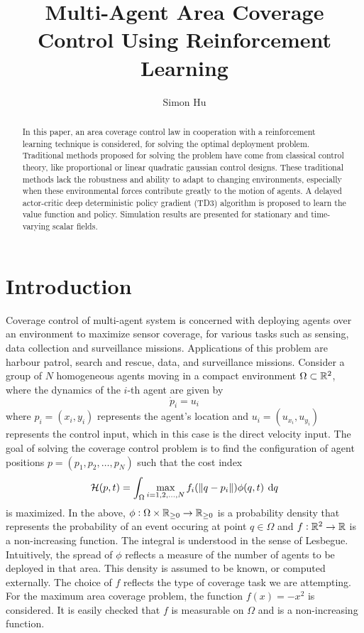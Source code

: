 \documentclass[10pt,conference]{IEEEtran}
\title{\bf\Large{Multi-Agent Area Coverage Control Using Reinforcement Learning}}
\author{Simon Hu}
\begin{document}
	
\maketitle
\thispagestyle{empty}
\pagestyle{empty}
\begin{abstract}
	In this paper, an area coverage control law in cooperation with a reinforcement learning technique is considered, for solving the optimal deployment problem. Traditional methods proposed for solving the problem have come from classical control theory, like proportional or linear quadratic gaussian control designs. These traditional methods lack the robustness and ability to adapt to changing environments, especially when these environmental forces contribute greatly to the motion of agents. A delayed actor-critic deep deterministic policy gradient (TD3) algorithm is proposed to learn the value function and policy. Simulation results are presented for stationary and time-varying scalar fields. 
\end{abstract}
\section{Introduction}
	Coverage control of multi-agent system is concerned with deploying agents over an environment to maximize sensor coverage, for various tasks such as sensing, data collection and surveillance missions. Applications of this problem are harbour patrol, search and rescue, data, and surveillance missions. Consider a group of $N$ homogeneous agents moving in a compact environment $\Omega \subset \mathbb{R}^2$, where the dynamics of the $i$-th agent are given by 
	\begin{equation}
		\label{dynamics}
		\displaystyle \dot{p}_i = u_i
	\end{equation}
	where $p_i = (x_i, y_i)$ represents the agent's location and $u_i = (u_{x_i}, u_{y_i})$ represents the control input, which in this case is the direct velocity input. The goal of solving the coverage control problem is to find the configuration of agent positions $p = (p_1, p_2, \dots, p_N)$ such that the cost index 
	\begin{equation}
		\label{cost index}
		\displaystyle \mathcal{H}(p,t) = \int_{\Omega}{\max\limits_{i=1,2,\dots,N}{f_i(\,\norm{q - p_i})}\phi(q,t) \: \dif q}
	\end{equation}
	is maximized. In the above, $\phi : \Omega \times \mathbb{R}_{\geq 0} \to \mathbb{R}_{\geq 0}$ is a probability density that represents the probability of an event occuring at point $q \in \Omega$ and $f: \mathbb{R}^2 \to \mathbb{R}$ is a non-increasing function. The integral is understood in the sense of Lesbegue. Intuitively, the spread of $\phi$ reflects a measure of the number of agents to be deployed in that area. This density is assumed to be known, or computed externally. The choice of $f$ reflects the type of coverage task we are attempting. For the maximum area coverage problem, the function $f(x) = -x^2$ is considered. It is easily checked that $f$ is measurable on $\Omega$ and is a non-increasing function. 
\end{document}
